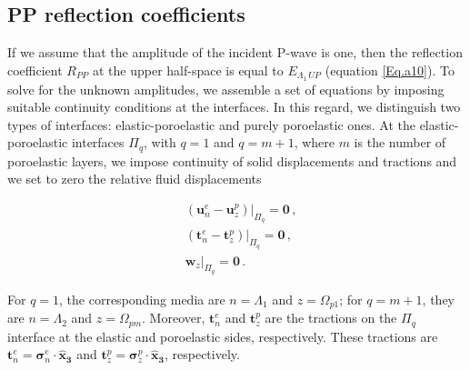 \documentclass[draft]{agujournal2019}
\begin{document}
\subsection{PP reflection coefficients}
If we assume that the amplitude of the incident P-wave is one, then the reflection coefficient $R_{PP}$ at the upper half-space is equal to $E_{\Lambda_1\, UP}$ (equation \eqref{Eq.a10}). To solve for the unknown amplitudes, we assemble a set of equations by imposing suitable continuity conditions at the interfaces.
In this regard, we distinguish two types of interfaces: elastic-poroelastic and purely poroelastic ones. At the elastic-poroelastic interfaces $\Pi_q$, with  $q=1$ and $q=m+1$, where $m$ is the number of poroelastic layers,
we impose continuity of solid displacements and tractions and we set to zero the relative fluid displacements \cite{Deresiewicz1963}
\begin{linenomath*}
\begin{equation}\label{Eq. a18}
\begin{split}
&  \left. \left(  \bm{u}_n^e -  \bm{u}_z^p \right) \right \rvert_{\Pi_q} = \bm{0} \,, \\
&  \left. \left(  \bm{t}_n^e -  \bm{t}_z^p \right) \right \rvert_{\Pi_q} = \bm{0} \,,\\
& \left.  \bm{w}_z \right \rvert_{\Pi_q} = \bm{0} \,.
\end{split}
\end{equation}
\end{linenomath*}
For $q=1$, the corresponding media are $n=\Lambda_1$ and $z=\Omega_{p1}$; for $q=m+1$, they are $n=\Lambda_2$ and $z=\Omega_{pm}$. Moreover, $ \bm{t}_n^e$ and $\bm{t}_z^p$ are the tractions on the $\Pi_q$ interface at the elastic and poroelastic sides, respectively. These tractions are $ \bm{t}_n^e =\bm{ \sigma}_n^e \cdot \bm{\hat{x}_3}$ and $ \bm{t}_z^p = \bm{\sigma}_z^p \cdot \bm{\hat{x}_3}$, respectively.
\end{document}
